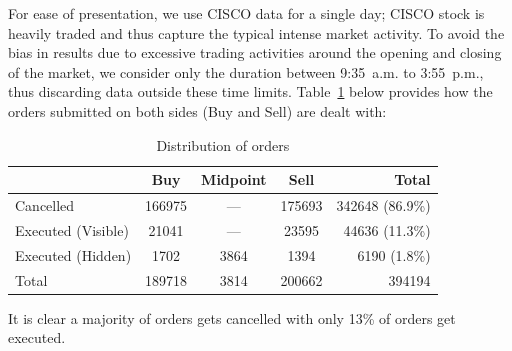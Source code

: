 For ease of presentation, we use CISCO data for a single day; CISCO stock is heavily traded and thus capture the typical intense market activity. To avoid the bias in results due to excessive trading activities around the opening and closing of the market, we consider only the duration between 9:35~a.m. to 3:55~p.m., thus discarding data outside these time limits. Table~\ref{tab:distributionoforder} below provides how the orders submitted on both sides (Buy and Sell) are dealt with:
	\begin{table}[!ht]
	\centering
	\caption{Distribution of orders\label{tab:distributionoforder}}
	\begin{tabular}{l | ccc | r}
	& Buy & Midpoint & Sell & Total \\ \hline
	Cancelled & 166975 & --- & 175693 & 342648 (86.9\%) \\
	Executed (Visible) & 21041 & --- & 23595 & 44636 (11.3\%) \\
	Executed (Hidden) & 1702 & 3864 & 1394 & 6190 (1.8\%) \\ \hline
	Total & 189718 & 3814 & 200662 & 394194
	\end{tabular}
	\end{table}
It is clear a majority of orders gets cancelled with only 13\% of orders get executed. 


